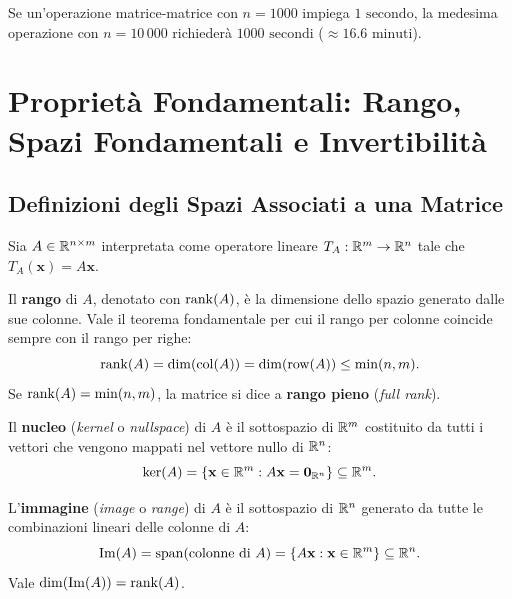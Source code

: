 Se un'operazione matrice-matrice con $n = 1000$ impiega $1\text{ secondo}$, la medesima operazione con $n = 10\,000$ richieder\`a $1000\text{ secondi}$ ($\approx 16.6\text{ minuti}$).

\FloatBarrier
\section{Propriet\`a Fondamentali: Rango, Spazi Fondamentali e Invertibilit\`a}

\subsection{Definizioni degli Spazi Associati a una Matrice}

Sia $A \in \mathbb{R}^{n \times m}$ interpretata come operatore lineare $T_A: \mathbb{R}^m \to \mathbb{R}^n$ tale che $T_A(\mathbf{x}) = A\mathbf{x}$.

\begin{definition}
Il \textbf{rango} di $A$, denotato con $\operatorname{rank}(A)$, \`e la dimensione dello spazio generato dalle sue colonne. Vale il teorema fondamentale per cui il rango per colonne coincide sempre con il rango per righe:
\begin{equation}
    \operatorname{rank}(A) = \dim(\mathrm{col}(A)) = \dim(\mathrm{row}(A)) \le \min(n, m).
\end{equation}
Se $\operatorname{rank}(A) = \min(n, m)$, la matrice si dice a \textbf{rango pieno} (\textit{full rank}).
\end{definition}

\begin{definition}
Il \textbf{nucleo} (\textit{kernel} o \textit{nullspace}) di $A$ \`e il sottospazio di $\mathbb{R}^m$ costituito da tutti i vettori che vengono mappati nel vettore nullo di $\mathbb{R}^n$:
\begin{equation}
    \ker(A) = \left\{ \mathbf{x} \in \mathbb{R}^m : A\mathbf{x} = \mathbf{0}_{\mathbb{R}^n} \right\} \subseteq \mathbb{R}^m.
\end{equation}
\end{definition}

\begin{definition}
L'\textbf{immagine} (\textit{image} o \textit{range}) di $A$ \`e il sottospazio di $\mathbb{R}^n$ generato da tutte le combinazioni lineari delle colonne di $A$:
\begin{equation}
    \mathrm{Im}(A) = \operatorname{span}(\text{colonne di } A) = \left\{ A\mathbf{x} : \mathbf{x} \in \mathbb{R}^m \right\} \subseteq \mathbb{R}^n.
\end{equation}
Vale $\dim(\mathrm{Im}(A)) = \operatorname{rank}(A)$.
\end{definition}

